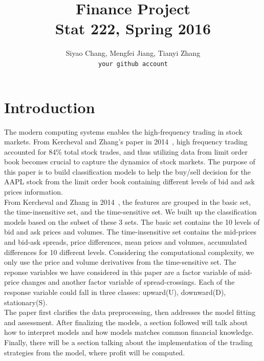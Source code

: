 \documentclass[11pt]{article}
\title{Finance Project\\
  Stat 222, Spring 2016}
\author{
  Siyao Chang, Mengfei Jiang, Tianyi Zhang\\
  \texttt{your github account}
}
\begin{document}
\maketitle



\section{Introduction}
The modern computing systems enables the high-frequency trading in stock markets. From Kercheval and Zhang's paper in 2014~\cite{financesvm}, high frequency trading accounted for 84\% total stock trades, and thus utilizing data from limit order book becomes crucial to capture the dynamics of stock markets. The purpose of this paper is to build classification models to help the buy/sell decision for the AAPL stock from the limit order book containing different levels of bid and ask prices information.\\
From Kercheval and Zhang in 2014~\cite{financesvm}, the features are grouped in the basic set, the time-insensitive set, and the time-sensitive set. We built up the classification models based on the subset of these 3 sets. The basic set contains the 10 levels of bid and ask prices and volumes. The time-insensitive set contains the mid-prices and bid-ask spreads, price differences, mean prices and volumes, accumulated differences for 10 different levels. Considering the computational complexity, we only use the price and volume derivatives from the time-sensitive set. The reponse variables we have considered in this paper are a factor variable of mid-price changes and another factor variable of spread-crossings. Each of the response variable could fall in three classes: upward(U), downward(D), stationary(S).\\
The paper first clarifies the data preprocessing, then addresses the model fitting and assessment. After finalizing the models, a section followed will talk about how to interpret models and how models matches common financial knowledge. Finally, there will be a section talking about the implementation of the trading strategies from the model, where profit will be computed.
\end{document}
